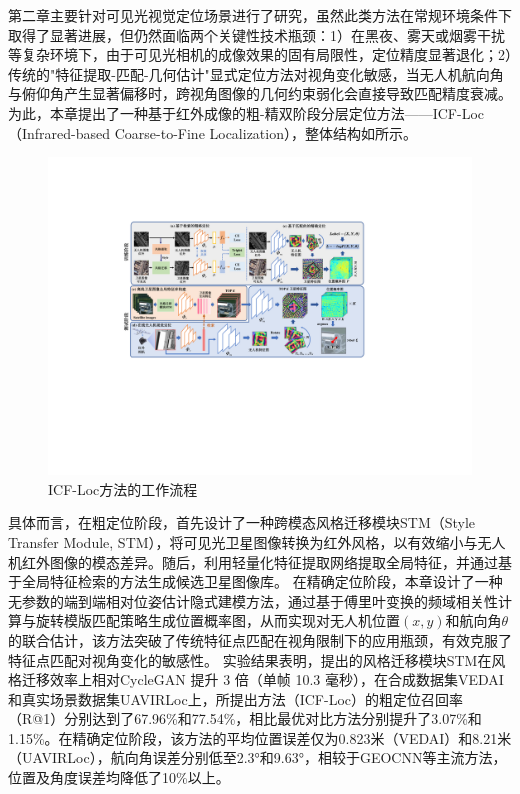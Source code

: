 \documentclass[12pt]{article}
\begin{document}
第二章主要针对可见光视觉定位场景进行了研究，虽然此类方法在常规环境条件下取得了显著进展，但仍然面临两个关键性技术瓶颈：1）在黑夜、雾天或烟雾干扰等复杂环境下，由于可见光相机的成像效果的固有局限性，定位精度显著退化；2）传统的"特征提取-匹配-几何估计"显式定位方法对视角变化敏感，当无人机航向角与俯仰角产生显著偏移时，跨视角图像的几何约束弱化会直接导致匹配精度衰减。
为此，本章提出了一种基于红外成像的粗-精双阶段分层定位方法——ICF-Loc（Infrared-based Coarse-to-Fine Localization），整体结构如所示。

\begin{figure}[H]
	\centering
	\includegraphics[width=1.0\textwidth]{figures/existingwork/红外-框架图-中文.pdf}
	\caption{ICF-Loc方法的工作流程
	} \label{iroverall}
\end{figure}


具体而言，在粗定位阶段，首先设计了一种跨模态风格迁移模块STM（Style Transfer Module, STM），将可见光卫星图像转换为红外风格，以有效缩小与无人机红外图像的模态差异。随后，利用轻量化特征提取网络提取全局特征，并通过基于全局特征检索的方法生成候选卫星图像库。
在精确定位阶段，本章设计了一种无参数的端到端相对位姿估计隐式建模方法，通过基于傅里叶变换的频域相关性计算与旋转模版匹配策略生成位置概率图，从而实现对无人机位置$(x, y)$和航向角$\theta$的联合估计，该方法突破了传统特征点匹配在视角限制下的应用瓶颈，有效克服了特征点匹配对视角变化的敏感性。
实验结果表明，提出的风格迁移模块STM在风格迁移效率上相对CycleGAN 提升 3 倍（单帧 10.3 毫秒），在合成数据集VEDAI和真实场景数据集UAVIRLoc上，所提出方法（ICF-Loc）的粗定位召回率（R@1）分别达到了67.96\%和77.54\%，相比最优对比方法分别提升了3.07\%和1.15\%。在精确定位阶段，该方法的平均位置误差仅为0.823米（VEDAI）和8.21米（UAVIRLoc），航向角误差分别低至2.3°和9.63°，相较于GEOCNN等主流方法，位置及角度误差均降低了10\%以上。
\end{document}
